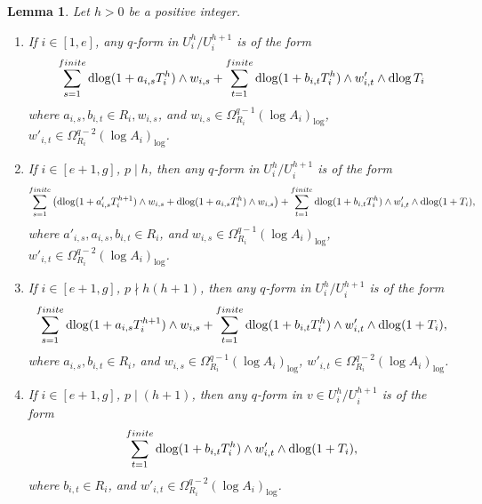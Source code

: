 \documentclass[11pt]{amsart}
\newcommand{\dlog}{\operatorname{dlog}}
\theoremstyle{plain}
\newtheorem{lem}[prop]{Lemma}
\theoremstyle{definition}
\numberwithin{equation}{prop}
\begin{document}
\begin{lem}
\label{lem2}
Let $h>0$ be a positive integer.
\begin{enumerate}
\item 
\label{lem2(1)}
If $i\in [1,e]$, 
any $q$-form in $U_i^{h}/U_i^{h+1}$
is of the form
\begin{align*}
\sum_{s=1}^{\rm finite}
\dlog(1+a_{i,s}T_i^{h})\wedge  w_{i,s}
+
\sum_{t=1}^{\rm finite}
\dlog(1+b_{i,t}T_i^{h})\wedge  w'_{i,t} \wedge \dlog T_i
\end{align*}
where $a_{i,s},b_{i,t}\in R_i, w_{i,s}$, and
$w_{i,s}\in \Omega^{q-1}_{R_i}(\log A_i)_{\log}$, $w'_{i,t}\in \Omega^{q-2}_{R_i}(\log A_i)_{\log}$.
\item 
\label{lem2(2)}
If $i\in [e+1,g]$, $p\mid h$, then any $q$-form in 
$U_i^{h}/U_i^{h+1}$ is of the  form
$$
\sum_{s=1}^{\rm finite} \left(
\dlog(1+a'_{i,s}T_i^{h+1})\wedge w_{i,s}
+
\dlog(1+a_{i,s}T_i^{h})\wedge w_{i,s}
\right)
+
\sum_{t=1}^{\rm finite}
\dlog(1+b_{i,t}T_i^{h})\wedge w'_{i,t}\wedge \dlog (1+T_i),$$
where $a'_{i,s},a_{i,s},b_{i,t}\in R_i$, and
$w_{i,s}\in \Omega^{q-1}_{R_i}(\log A_i)_{\log}$, $w'_{i,t}\in \Omega^{q-2}_{R_i}(\log A_i)_{\log}$.
\item 
\label{lem2(3)}
If $i\in [e+1,g]$, $p\nmid h(h+1)$, then any $q$-form in 
$U_i^{h}/U_i^{h+1}$ is of the  form
$$
\sum_{s=1}^{\rm finite}
\dlog(1+a_{i,s}T_i^{h+1})\wedge w_{i,s}
+
\sum_{t=1}^{\rm finite}
\dlog(1+b_{i,t}T_i^{h})\wedge w'_{i,t}\wedge \dlog (1+T_i),$$
where $a_{i,s},b_{i,t}\in R_i$, and
$w_{i,s}\in \Omega^{q-1}_{R_i}(\log A_i)_{\log}$, $w'_{i,t}\in \Omega^{q-2}_{R_i}(\log A_i)_{\log}$.
\item 
\label{lem2(4)}
If $i\in [e+1,g]$, $p\mid (h+1)$, then any $q$-form in 
$v\in U_i^{h}/U_i^{h+1}$ is of the  form
$$
\sum_{t=1}^{\rm finite}
\dlog(1+b_{i,t}T_i^{h})\wedge w'_{i,t}\wedge \dlog (1+T_i),$$
where $b_{i,t}\in R_i$, and
$w'_{i,t}\in \Omega^{q-2}_{R_i}(\log A_i)_{\log}$.
\end{enumerate}
\end{lem}
\end{document}
